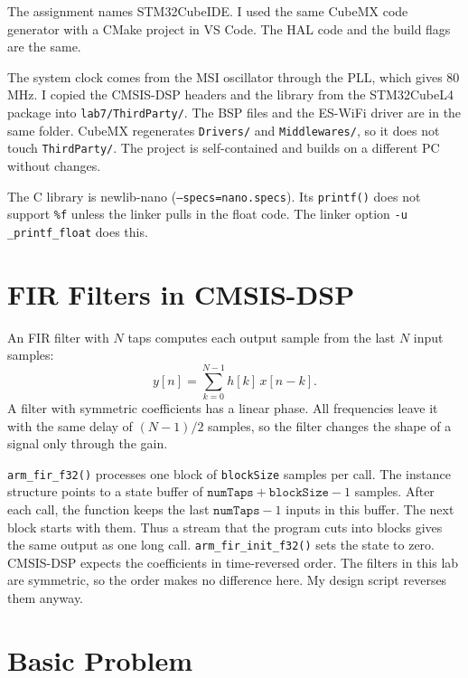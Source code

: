 \documentclass[11pt,a4paper]{article}
\begin{document}
The assignment names STM32CubeIDE. I used the same CubeMX code generator with
a CMake project in VS Code. The HAL code and the build flags are the same.

The system clock comes from the MSI oscillator through the PLL, which gives
80\,MHz. I copied the CMSIS-DSP headers and the library from the STM32CubeL4
package into \texttt{lab7/ThirdParty/}. The BSP files and the ES-WiFi driver
are in the same folder. CubeMX regenerates \texttt{Drivers/} and
\texttt{Middlewares/}, so it does not touch \texttt{ThirdParty/}. The project is
self-contained and builds on a different PC without changes.

The C library is newlib-nano (\texttt{--specs=nano.specs}). Its
\texttt{printf()} does not support \texttt{\%f} unless the linker pulls in the
float code. The linker option \texttt{-u \_printf\_float} does this.

\section{FIR Filters in CMSIS-DSP}

An FIR filter with $N$ taps computes each output sample from the last $N$
input samples:
\begin{equation}
  y[n] = \sum_{k=0}^{N-1} h[k]\, x[n-k].
\end{equation}
A filter with symmetric coefficients has a linear phase. All frequencies
leave it with the same delay of $(N-1)/2$ samples, so the filter changes the
shape of a signal only through the gain.

\texttt{arm\_fir\_f32()} processes one block of \texttt{blockSize} samples per
call. The instance structure points to a state buffer of
$\texttt{numTaps}+\texttt{blockSize}-1$ samples. After each call, the function
keeps the last $\texttt{numTaps}-1$ inputs in this buffer. The next block
starts with them. Thus a stream that the program cuts into blocks gives the
same output as one long call. \texttt{arm\_fir\_init\_f32()} sets the state to
zero. CMSIS-DSP expects the coefficients in time-reversed order. The filters
in this lab are symmetric, so the order makes no difference here. My design
script reverses them anyway.

\section{Basic Problem}
\end{document}
